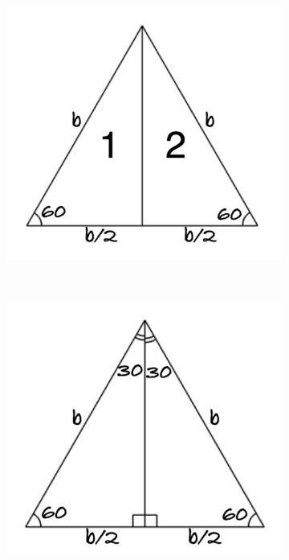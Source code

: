 \documentclass[12pt,letter]{article}
\begin{document}
\begin{figure}[h]
\begin{subfigure}[h]{0.3\textwidth}
		\caption{}
		\label{fig:equil_tri_b}
	\end{subfigure}
	~
	\begin{subfigure}[h]{0.3\textwidth}
		\includegraphics[width=\textwidth]{equil_tri_c.pdf}
		\caption{}
		\label{fig:equil_tri_c}
	\end{subfigure} \\
	\begin{subfigure}[h]{0.3\textwidth}
		\includegraphics[width=\textwidth]{equil_tri_d.pdf}

\end{subfigure}
\end{figure}
\end{document}
